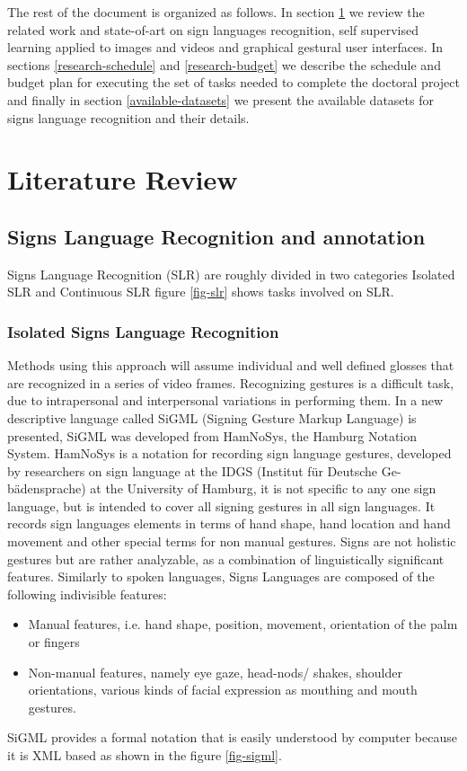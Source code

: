 The rest of the document is organized as follows. In section \ref{literature-review} we review the related work and state-of-art on sign languages recognition, self supervised learning applied to images and videos and graphical gestural user interfaces. In sections \ref{research-schedule} and \ref{research-budget} we describe the schedule and budget plan for executing the set of tasks needed to complete the doctoral project and finally in section \ref{available-datasets} we present the available datasets for signs language recognition and their details.


\section{Literature Review}\label{literature-review}
\subsection{Signs Language Recognition and annotation}
Signs Language Recognition (SLR) are roughly divided in two categories Isolated SLR and Continuous SLR\cite{adaloglou2020comprehensive} figure \ref{fig-slr} shows tasks involved on SLR.

\subsubsection{Isolated Signs Language Recognition}
Methods using this approach will assume individual and well defined glosses that are recognized in a series of video frames. Recognizing gestures is a difficult task, due to intrapersonal and interpersonal variations in performing them. In \cite{kennaway2015avatar} a new descriptive language called SiGML (Signing Gesture Markup Language) is presented, SiGML was developed from HamNoSys, the Hamburg Notation System. HamNoSys is a notation for recording sign language gestures, developed by researchers on sign language at the IDGS (Institut für Deutsche Ge-bädensprache) at the University of Hamburg, it is not specific to any one sign language, but is intended to cover all signing gestures in all sign languages. It records sign languages elements in terms of hand shape, hand location and hand movement and other special terms for non manual gestures. Signs are not holistic gestures but are rather analyzable, as a combination of linguistically significant features. Similarly to spoken languages, Signs Languages are composed of the following indivisible features\cite{adaloglou2020comprehensive}:
\begin{itemize}
\item Manual features, i.e. hand shape, position, movement, orientation of the palm or fingers
\item Non-manual features, namely eye gaze, head-nods/ shakes, shoulder orientations, various kinds of facial expression as mouthing and mouth gestures.
\end{itemize}
SiGML provides a formal notation that is easily understood by computer because it is XML based as shown in the figure \ref{fig-sigml}.

